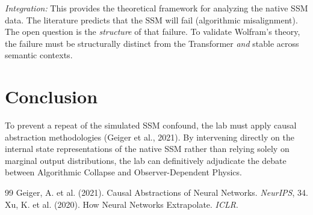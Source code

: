 \documentclass[12pt,a4paper]{article}
\begin{document}
\textit{Integration:} This provides the theoretical framework for analyzing the native SSM data. The literature predicts that the SSM will fail (algorithmic misalignment). The open question is the \textit{structure} of that failure. To validate Wolfram's theory, the failure must be structurally distinct from the Transformer \textit{and} stable across semantic contexts.

\section{Conclusion}

To prevent a repeat of the simulated SSM confound, the lab must apply causal abstraction methodologies (Geiger et al., 2021). By intervening directly on the internal state representations of the native SSM rather than relying solely on marginal output distributions, the lab can definitively adjudicate the debate between Algorithmic Collapse and Observer-Dependent Physics.

\begin{thebibliography}{99}
 Geiger, A. et al. (2021). Causal Abstractions of Neural Networks. \emph{NeurIPS}, 34.
 Xu, K. et al. (2020). How Neural Networks Extrapolate. \emph{ICLR}.
\end{thebibliography}
\end{document}
